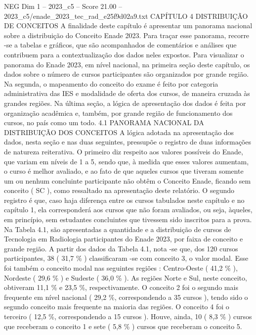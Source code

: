 \begin{textsample}{NEG Dim 1 – 2023\_c5 – Score 21.00 – 2023\_c5/enade\_2023\_tec\_rad\_e25f9d02a9.txt}  \label{ex:f1_neg_427}
CAPÍTULO 4 DISTRIBUIÇÃO DE CONCEITOS A finalidade deste capítulo é apresentar um panorama nacional sobre a distribuição do Conceito Enade 2023.
Para traçar esse panorama, recorre -se a tabelas e gráficos, que são acompanhados de comentários e análises que contribuem para a contextualização dos dados neles expostos.
Para visualizar o panorama do Enade 2023, em nível nacional, na primeira seção deste capítulo, os dados sobre o número de cursos participantes são organizados por grande região.
Na segunda, o mapeamento do conceito do exame é feito por categoria administrativa das IES e modalidade de oferta dos cursos, de maneira cruzada às grandes regiões.
Na última seção, a lógica de apresentação dos dados é feita por organização acadêmica e, também, por grande região de funcionamento dos cursos, no país como um todo. 4.1 PANORAMA NACIONAL DA DISTRIBUIÇÃO DOS CONCEITOS A lógica adotada na apresentação dos dados, nesta seção e nas duas seguintes, pressupõe o registro de duas informações de natureza reiterativa.
O primeiro diz respeito aos valores possíveis do Enade, que variam em níveis de 1 a 5, sendo que, à medida que esses valores aumentam, o curso é melhor avaliado, e ao fato de que aqueles cursos que tiveram somente um ou nenhum concluinte participante não obtêm o Conceito Enade, ficando sem conceito ( SC ), como ressaltado na apresentação deste relatório.
O segundo registro é que, caso haja diferença entre os cursos tabulados neste capítulo e no capítulo 1, ela corresponderá aos cursos que não foram avaliados, ou seja, àqueles, em princípio, sem estudantes concluintes que tivessem sido inscritos para a prova.
Na Tabela 4.1, são apresentadas a quantidade e a distribuição de cursos de Tecnologia em Radiologia participantes do Enade 2023, por faixa de conceito e grande região.
A partir dos dados da Tabela 4.1, nota -se que, dos 120 cursos participantes, 38 ( 31,7 \% ) classificaram -se com conceito 3, o valor modal.
Esse foi também o conceito modal nas seguintes regiões : Centro-Oeste ( 41,2 \% ), Nordeste ( 29,6 \% ) e Sudeste ( 36,0 \% ).
As regiões Norte e Sul, neste conceito, obtiveram 11,1 \% e 23,5 \%, respectivamente.
O conceito 2 foi o segundo mais frequente em nível nacional ( 29,2 \%, correspondendo a 35 cursos ), tendo sido o segundo conceito mais frequente na maioria das regiões.
O conceito 4 foi o terceiro ( 12,5 \%, correspondendo a 15 cursos ).
Houve, ainda, 10 ( 8,3 \% ) cursos que receberam o conceito 1 e sete ( 5,8 \% ) cursos que receberam o conceito 5.

\end{textsample}
